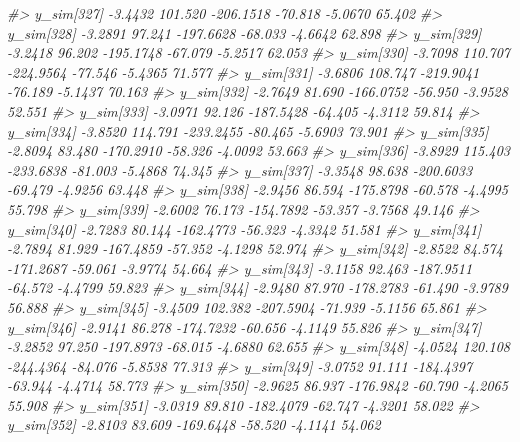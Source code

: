 \documentclass[
  10pt,
  italian,
  a4paper,
  extrafontsizes,onecolumn,openright
  ]{memoir}
\newenvironment{Shaded}{\begin{snugshade}}{\end{snugshade}}
\newcommand{\CommentTok}[1]{\textcolor[rgb]{0.56,0.35,0.01}{\textit{#1}}}
\begin{document}
\begin{Shaded}
\begin{Highlighting}[]
\CommentTok{\#\textgreater{}   y\_sim[327] {-}3.4432 101.520 {-}206.1518 {-}70.818 {-}5.0670 65.402}
\CommentTok{\#\textgreater{}   y\_sim[328] {-}3.2891  97.241 {-}197.6628 {-}68.033 {-}4.6642 62.898}
\CommentTok{\#\textgreater{}   y\_sim[329] {-}3.2418  96.202 {-}195.1748 {-}67.079 {-}5.2517 62.053}
\CommentTok{\#\textgreater{}   y\_sim[330] {-}3.7098 110.707 {-}224.9564 {-}77.546 {-}5.4365 71.577}
\CommentTok{\#\textgreater{}   y\_sim[331] {-}3.6806 108.747 {-}219.9041 {-}76.189 {-}5.1437 70.163}
\CommentTok{\#\textgreater{}   y\_sim[332] {-}2.7649  81.690 {-}166.0752 {-}56.950 {-}3.9528 52.551}
\CommentTok{\#\textgreater{}   y\_sim[333] {-}3.0971  92.126 {-}187.5428 {-}64.405 {-}4.3112 59.814}
\CommentTok{\#\textgreater{}   y\_sim[334] {-}3.8520 114.791 {-}233.2455 {-}80.465 {-}5.6903 73.901}
\CommentTok{\#\textgreater{}   y\_sim[335] {-}2.8094  83.480 {-}170.2910 {-}58.326 {-}4.0092 53.663}
\CommentTok{\#\textgreater{}   y\_sim[336] {-}3.8929 115.403 {-}233.6838 {-}81.003 {-}5.4868 74.345}
\CommentTok{\#\textgreater{}   y\_sim[337] {-}3.3548  98.638 {-}200.6033 {-}69.479 {-}4.9256 63.448}
\CommentTok{\#\textgreater{}   y\_sim[338] {-}2.9456  86.594 {-}175.8798 {-}60.578 {-}4.4995 55.798}
\CommentTok{\#\textgreater{}   y\_sim[339] {-}2.6002  76.173 {-}154.7892 {-}53.357 {-}3.7568 49.146}
\CommentTok{\#\textgreater{}   y\_sim[340] {-}2.7283  80.144 {-}162.4773 {-}56.323 {-}4.3342 51.581}
\CommentTok{\#\textgreater{}   y\_sim[341] {-}2.7894  81.929 {-}167.4859 {-}57.352 {-}4.1298 52.974}
\CommentTok{\#\textgreater{}   y\_sim[342] {-}2.8522  84.574 {-}171.2687 {-}59.061 {-}3.9774 54.664}
\CommentTok{\#\textgreater{}   y\_sim[343] {-}3.1158  92.463 {-}187.9511 {-}64.572 {-}4.4799 59.823}
\CommentTok{\#\textgreater{}   y\_sim[344] {-}2.9480  87.970 {-}178.2783 {-}61.490 {-}3.9789 56.888}
\CommentTok{\#\textgreater{}   y\_sim[345] {-}3.4509 102.382 {-}207.5904 {-}71.939 {-}5.1156 65.861}
\CommentTok{\#\textgreater{}   y\_sim[346] {-}2.9141  86.278 {-}174.7232 {-}60.656 {-}4.1149 55.826}
\CommentTok{\#\textgreater{}   y\_sim[347] {-}3.2852  97.250 {-}197.8973 {-}68.015 {-}4.6880 62.655}
\CommentTok{\#\textgreater{}   y\_sim[348] {-}4.0524 120.108 {-}244.4364 {-}84.076 {-}5.8538 77.313}
\CommentTok{\#\textgreater{}   y\_sim[349] {-}3.0752  91.111 {-}184.4397 {-}63.944 {-}4.4714 58.773}
\CommentTok{\#\textgreater{}   y\_sim[350] {-}2.9625  86.937 {-}176.9842 {-}60.790 {-}4.2065 55.908}
\CommentTok{\#\textgreater{}   y\_sim[351] {-}3.0319  89.810 {-}182.4079 {-}62.747 {-}4.3201 58.022}
\CommentTok{\#\textgreater{}   y\_sim[352] {-}2.8103  83.609 {-}169.6448 {-}58.520 {-}4.1141 54.062}

\end{Highlighting}
\end{Shaded}
\end{document}
